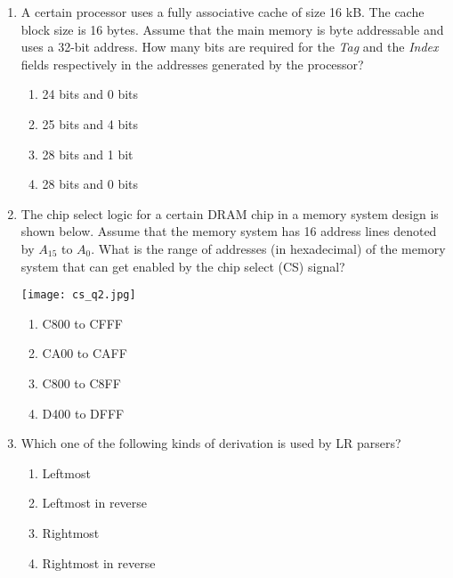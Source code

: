 \documentclass[12pt]{article}
\begin{document}
\begin{enumerate}[label=Q.\arabic*]

	\item A certain processor uses a fully associative cache of size 16 kB. The cache block size is 16 bytes. Assume that the main memory is byte addressable and uses a 32-bit address. How many bits are required for the \textit{Tag} and the \textit{Index} fields respectively in the addresses generated by the processor?

\begin{multicols}{2}
\begin{enumerate}[label=(\Alph*)]
\item 24 bits and 0 bits
\item 25 bits and 4 bits
\item 28 bits and 1 bit
\item 28 bits and 0 bits
\end{enumerate}
\end{multicols}

\item The chip select logic for a certain DRAM chip in a memory system design is shown below. Assume that the memory system has 16 address lines denoted by $A_{15}$ to $A_0$. What is the range of addresses (in hexadecimal) of the memory system that can get enabled by the chip select (CS) signal?

	\begin{center}{
			\texttt{[image: cs\_q2.jpg]}
		}
\end{center}

\begin{multicols}{2}
\begin{enumerate}[label=(\Alph*)]
\item C800 to CFFF
\item CA00 to CAFF
\item C800 to C8FF
\item D400 to DFFF
\end{enumerate}
\end{multicols}

\item Which one of the following kinds of derivation is used by LR parsers?

\begin{multicols}{2}
\begin{enumerate}[label=(\Alph*)]
\item Leftmost
\item Leftmost in reverse
\item Rightmost
\item Rightmost in reverse
\end{enumerate}
\end{multicols}


\end{enumerate}
\end{document}
